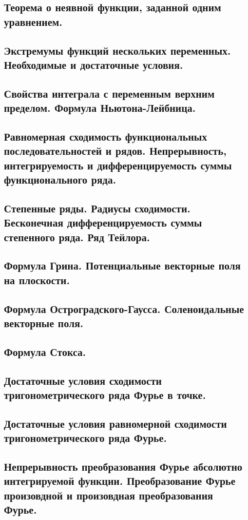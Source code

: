 \documentclass{urticle}
\theoremstyle{definition}
\begin{document}
\subsection{Теорема о неявной функции, заданной одним уравнением.}
\subsection{Экстремумы функций нескольких переменных. Необходимые и достаточные условия.}
\subsection{Свойства интеграла с переменным верхним пределом. Формула Ньютона-Лейбница.}
\subsection{Равномерная сходимость функциональных последовательностей и рядов. Непрерывность, интегрируемость и дифференцируемость суммы функционального ряда.}
\subsection{Степенные ряды. Радиусы сходимости. Бесконечная дифференцируемость суммы степенного ряда. Ряд Тейлора.}
\subsection{Формула Грина. Потенциальные векторные поля на плоскости.}
\subsection{Формула Остроградского-Гаусса. Соленоидальные векторные поля.}
\subsection{Формула Стокса.}
\subsection{Достаточные условия сходимости тригонометрического ряда Фурье в точке.}
\subsection{Достаточные условия равномерной сходимости тригонометрического ряда Фурье.}
\subsection{Непрерывность преобразования Фурье абсолютно интегрируемой функции. Преобразование Фурье произовдной и произовдная преобразования Фурье.}
\end{document}
